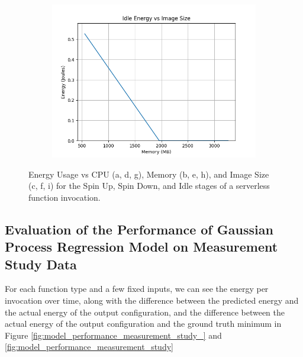 \documentclass[times, 10pt,twocolumn]{article}
\begin{document}
\begin{figure}[ht]
\begin{subfigure}[b]{0.3\textwidth}
      \includegraphics[width=\textwidth]{imgs/container_study/idle_vs_img.png}
     \caption{}
     \label{fig:idle_img}
   \end{subfigure}
   
   \caption{Energy Usage vs CPU (a, d, g), Memory (b, e, h), and Image Size (c, f, i) for the Spin Up, Spin Down, and Idle stages of a serverless function invocation.}
   \label{fig:energy_stages}
 \end{figure}


 
 \subsection{Evaluation of the Performance of Gaussian Process Regression Model on Measurement Study Data }
 \label{appendix:regression_model_measurement_study}

 For each function type and a few fixed inputs, we can see the energy per invocation over time, along with the difference between the predicted energy and the actual energy of the output configuration, and the difference between the actual energy of the output configuration and the ground truth minimum in Figure \ref{fig:model_performance_measurement_study_} and \ref{fig:model_performance_measurement_study}
\end{document}
